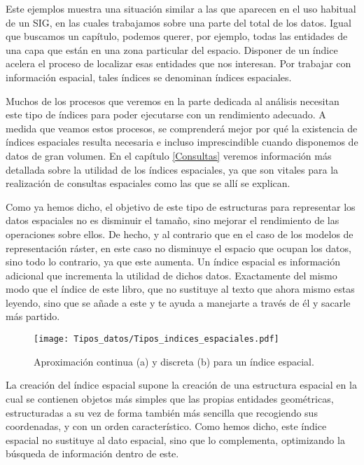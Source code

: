 \begin{multicols}{2}
Este ejemplos muestra una situación similar a las que aparecen en el uso habitual de un SIG, en las cuales trabajamos sobre una parte del total de los datos. Igual que buscamos un capítulo, podemos querer, por ejemplo, todas las entidades de una capa que están en una zona particular del espacio. Disponer de un índice acelera el proceso de localizar esas entidades que nos interesan. Por trabajar con información espacial, tales índices se denominan índices espaciales.

Muchos de los procesos que veremos en la parte dedicada al análisis necesitan este tipo de índices para poder ejecutarse con un rendimiento adecuado. A medida que veamos estos procesos, se comprenderá mejor por qué la existencia de índices espaciales resulta necesaria e incluso imprescindible cuando disponemos de datos de gran volumen. En el capítulo \ref{Consultas} veremos información más detallada sobre la utilidad de los índices espaciales, ya que son vitales para la realización de consultas espaciales como las que se allí se explican.

Como ya hemos dicho, el objetivo de este tipo de estructuras para representar los datos espaciales no es disminuir el tamaño, sino mejorar el rendimiento de las operaciones sobre ellos. De hecho, y al contrario que en el caso de los modelos de representación ráster, en este caso no disminuye el espacio que ocupan los datos, sino todo lo contrario, ya que este aumenta. Un índice espacial es información adicional que incrementa la utilidad de dichos datos. Exactamente del mismo modo que el índice de este libro, que no sustituye al texto que ahora mismo estas leyendo, sino que se añade a este y te ayuda a manejarte a través de él y sacarle más partido.

\begin{figure*}[!ht]   
\centering
\texttt{[image: Tipos\_datos/Tipos\_indices\_espaciales.pdf]}
\caption{\small Aproximación continua (a) y discreta (b) para un índice espacial.}
\label{Fig:Tipos_indices_espaciales} 
\end{figure*}

La creación del índice espacial supone la creación de una estructura espacial en la cual se contienen objetos más simples que las propias entidades geométricas, estructuradas a su vez de forma también más sencilla que recogiendo sus coordenadas, y con un orden característico. Como hemos dicho, este índice espacial no sustituye al dato espacial, sino que lo complementa, optimizando la búsqueda de información dentro de este.


\end{multicols}
